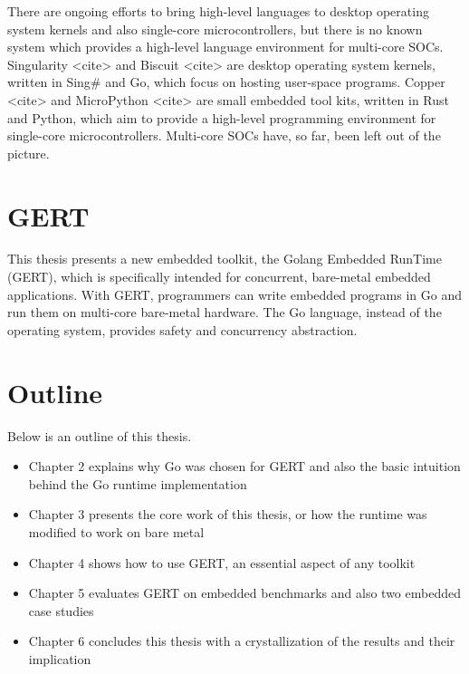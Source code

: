 There are ongoing efforts to bring high-level languages to desktop
operating system kernels and also single-core microcontrollers, but
there is no known system which provides a high-level language environment for
multi-core SOCs. Singularity <cite> and Biscuit <cite> are desktop
operating system kernels, written in Sing\# and Go, which focus on
hosting user-space programs. Copper <cite> and MicroPython <cite>
are small embedded tool kits, written in Rust and Python, which aim
to provide a high-level programming environment for single-core
microcontrollers. Multi-core SOCs have, so far, been left out of the
picture.

\section{GERT}

This thesis presents a new embedded toolkit, the Golang Embedded
RunTime (GERT), which is specifically intended for concurrent, bare-metal embedded applications.
With GERT, programmers can write embedded programs in Go and run them on multi-core bare-metal hardware.
The Go language, instead of the operating system, provides safety and concurrency abstraction.

\section{Outline}
Below is an outline of this thesis.
\begin{itemize}
  \item Chapter 2 explains why Go was chosen for GERT and also the basic intuition behind the Go runtime implementation
  \item Chapter 3 presents the core work of this thesis, or how the runtime was modified to work on bare metal
  \item Chapter 4 shows how to use GERT, an essential aspect of any toolkit
  \item Chapter 5 evaluates GERT on embedded benchmarks and also two embedded case studies
  \item Chapter 6 concludes this thesis with a crystallization of the results and their implication
\end{itemize}
